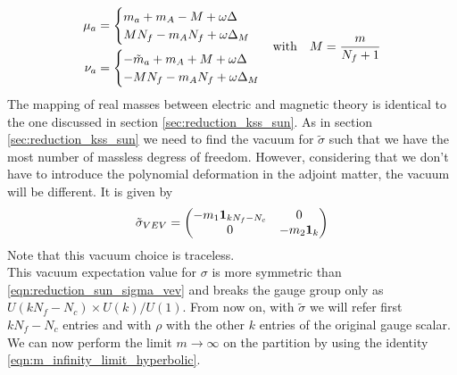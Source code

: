 \begin{equation}
\begin{aligned}
	\mu_a &  = \begin{cases}
	m_a + m_A - M + \omega \Delta \\
	M N_f - m_A N_f + \omega \Delta_M\\
	\end{cases}
	\\
 \nu_a & =   \begin{cases}
	- \tilde{m}_a + m_A + M + \omega \Delta \\
	- M N_f - m_A N_f + \omega \Delta_M \\
	\end{cases}
\end{aligned}
\\
\hbox{with} \quad M =  \frac{m}{N_f +1}
\end{equation}
The mapping of real masses between electric and magnetic theory is identical to the one discussed in section \ref{sec:reduction_kss_sun}.
As in section \ref{sec:reduction_kss_sun} we need to find the vacuum for $\tilde{\sigma}$ such that we have the most number of massless degress of freedom.
However, considering that we don't have to introduce the polynomial deformation in the adjoint matter, the vacuum will be different. It is given by
\begin{equation}
 \tilde{\sigma}_{VEV} =
 \begin{pmatrix}
	- m_1 \bold{ 1}_{ k N_f - N_c} & 0 \\
	0 &  - m_2 \bold{ 1}_{k}
 \end{pmatrix}
\end{equation}
Note that this vacuum choice is traceless.\\
This vacuum expectation value for $\sigma$ is more symmetric than \eqref{eqn:reduction_sun_sigma_vev} and breaks the gauge group only as $U(k N_f - N_c) \times U(k) / U(1)$.
From now on, with $\tilde{\sigma}$ we will refer first $k N_f - N_c$ entries and with $\rho$ with the other $k$ entries of the original gauge scalar.
\\
We can now perform the limit $m \rightarrow \infty$ on the partition by using the identity \eqref{eqn:m_infinity_limit_hyperbolic}.

